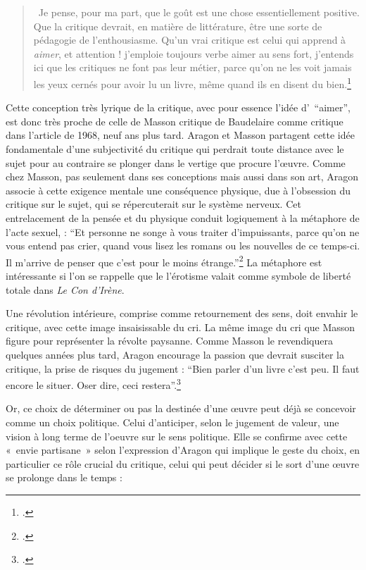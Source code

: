      \begin{quote}
       Je pense, pour ma part, que le goût est une chose essentiellement positive. Que la critique devrait, en matière de littérature, être une sorte de pédagogie de l’enthousiasme. Qu’un vrai critique est celui qui apprend à \emph{aimer}, et attention ! j’emploie toujours verbe aimer au sens fort, j’entends ici que les critiques ne font pas leur métier, parce qu’on ne les voit jamais les yeux cernés pour avoir lu un livre, même quand ils en disent du bien.\footcite{atraversgaleries}    
     \end{quote}


	 Cette conception très lyrique de la critique, avec pour essence l’idée d’ \enquote{aimer}, est donc très proche de celle de Masson critique de Baudelaire comme critique dans l’article de 1968, neuf ans plus tard. Aragon et Masson partagent cette idée fondamentale d’une subjectivité du critique qui perdrait toute distance avec le sujet pour au contraire se plonger dans le vertige que procure l’\oe{}uvre. Comme chez Masson, pas seulement dans ses conceptions mais aussi dans son art, Aragon associe à cette exigence mentale une conséquence physique, due à l’obsession du critique sur le sujet, qui se répercuterait sur le système nerveux. Cet entrelacement de la pensée et du physique conduit logiquement à la métaphore de l’acte sexuel, : \enquote{Et personne ne songe à vous traiter d’impuissants, parce qu’on ne vous entend pas crier, quand vous lisez les romans ou les nouvelles de ce temps-ci. Il m’arrive de penser que c’est pour le moins étrange.}\footcite{savoiraimer} La métaphore est intéressante si l'on se rappelle que le l'érotisme valait comme symbole de liberté totale dans \emph{Le Con d'Irène}. 

     	Une révolution intérieure, comprise comme retournement des sens, doit envahir le critique, avec cette image insaisissable du cri. La même image du cri que Masson figure pour représenter la révolte paysanne. Comme Masson le revendiquera quelques années plus tard, Aragon encourage la passion que devrait susciter la critique, la prise de risques du jugement : \enquote{Bien parler d’un livre c’est peu. Il faut encore le situer. Oser dire, ceci restera}.\footcite{savoiraimer}

 Or, ce choix de déterminer ou pas la destinée d’une \oe{}uvre peut déjà se concevoir comme un choix politique. Celui d’anticiper, selon le jugement de valeur, une vision à long terme de l’oeuvre sur le sens politique. Elle se confirme avec cette « envie partisane » selon l’expression d’Aragon qui implique le geste du choix, en  particulier ce rôle crucial du critique, celui qui peut décider si le sort d’une \oe{}uvre se prolonge dans le temps : 


